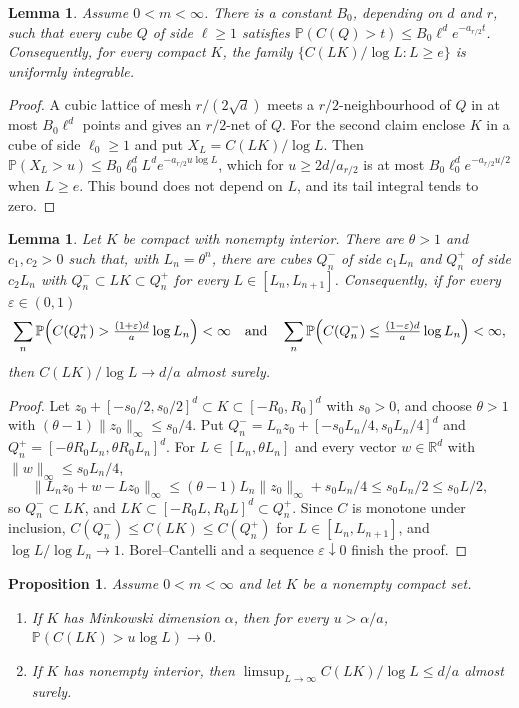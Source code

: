 \documentclass[11pt,a4paper]{article}
\numberwithin{equation}{section}
\newtheorem{lemma}[theorem]{Lemma}
\newtheorem{proposition}[theorem]{Proposition}
\theoremstyle{definition}
\theoremstyle{remark}
\newcommand{\Pp}{\mathbb P}
\newcommand{\R}{\mathbb R}
\begin{document}
\begin{lemma}\label{lem:ui}
Assume $0<m<\infty$. There is a constant $B_0$, depending on $d$ and $r$, such
that every cube $Q$ of side $\ell\ge1$ satisfies
$\Pp(C(Q)>t)\le B_0\ell^d e^{-a_{r/2}t}$. Consequently, for every compact $K$,
the family $\{C(LK)/\log L:L\ge e\}$ is uniformly integrable.
\end{lemma}

\begin{proof}
A cubic lattice of mesh $r/(2\sqrt d)$ meets a $r/2$-neighbourhood of $Q$ in
at most $B_0\ell^d$ points and gives an $r/2$-net of $Q$. For the second
claim enclose $K$ in a cube of side $\ell_0\ge1$ and
put $X_L=C(LK)/\log L$. Then
$\Pp(X_L>u)\le B_0\ell_0^dL^de^{-a_{r/2}u\log L}$, which for
$u\ge2d/a_{r/2}$ is at most $B_0\ell_0^de^{-a_{r/2}u/2}$ when $L\ge e$. This
bound does not depend on $L$, and its tail integral tends to zero.
\end{proof}

\begin{lemma}\label{lem:interp}
Let $K$ be compact with nonempty interior. There are $\theta>1$ and
$c_1,c_2>0$ such that, with $L_n=\theta^n$, there are cubes $Q_n^-$ of side
$c_1L_n$ and $Q_n^+$ of side $c_2L_n$ with $Q_n^-\subset LK\subset Q_n^+$ for
every $L\in[L_n,L_{n+1}]$. Consequently, if for every $\varepsilon\in(0,1)$
\[
\sum_n\Pp\Bigl(C(Q_n^+)>\tfrac{(1+\varepsilon)d}{a}\log L_n\Bigr)<\infty
\quad\text{and}\quad
\sum_n\Pp\Bigl(C(Q_n^-)\le\tfrac{(1-\varepsilon)d}{a}\log L_n\Bigr)<\infty,
\]
then $C(LK)/\log L\to d/a$ almost surely.
\end{lemma}

\begin{proof}
Let $z_0+[-s_0/2,s_0/2]^d\subset K\subset[-R_0,R_0]^d$ with $s_0>0$, and
choose $\theta>1$ with $(\theta-1)\lVert z_0\rVert_\infty\le s_0/4$. Put
$Q_n^-=L_nz_0+[-s_0L_n/4,s_0L_n/4]^d$ and
$Q_n^+=[-\theta R_0L_n,\theta R_0L_n]^d$. For $L\in[L_n,\theta L_n]$ and every
vector $w\in\R^d$ with $\lVert w\rVert_\infty\le s_0L_n/4$,
\[
\lVert L_nz_0+w-Lz_0\rVert_\infty\le(\theta-1)L_n\lVert z_0\rVert_\infty+s_0L_n/4\le s_0L_n/2\le s_0L/2,
\]
so $Q_n^-\subset LK$, and $LK\subset[-R_0L,R_0L]^d\subset Q_n^+$. Since $C$ is
monotone under inclusion, $C(Q_n^-)\le C(LK)\le C(Q_n^+)$ for
$L\in[L_n,L_{n+1}]$, and $\log L/\log L_n\to1$. Borel--Cantelli and a sequence
$\varepsilon\downarrow0$ finish the proof.
\end{proof}

\begin{proposition}\label{prop:upper}
Assume $0<m<\infty$ and let $K$ be a nonempty compact set.
\begin{enumerate}[label=(\roman*)]
\item If $K$ has Minkowski dimension $\alpha$, then for every $u>\alpha/a$,
$\Pp(C(LK)>u\log L)\to0$.
\item If $K$ has nonempty interior, then
$\limsup_{L\to\infty}C(LK)/\log L\le d/a$ almost surely.
\end{enumerate}
\end{proposition}
\end{document}
